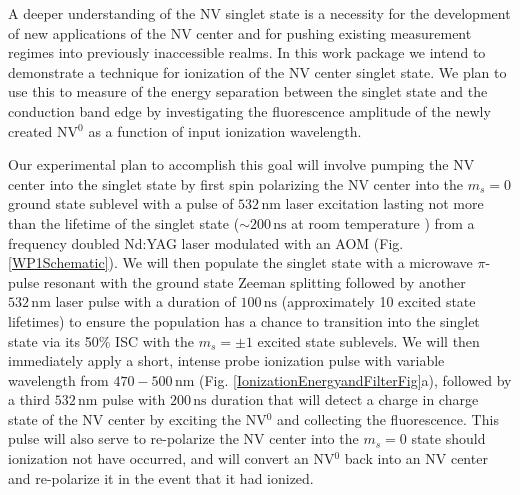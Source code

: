 \documentclass[11pt]{article}
\newcommand{\unit}[1]{\ensuremath{\, \mathrm{#1}}}
\begin{document}
A deeper understanding of the NV singlet state is a necessity for the development of new applications of the NV
center and for pushing existing measurement regimes into previously inaccessible realms.  In this work package we
intend to demonstrate a technique for ionization of the NV center singlet state.  We plan to use this to measure of the energy separation between the singlet state and the conduction band edge by investigating the fluorescence amplitude of the newly created NV$^0$ as a function of input ionization wavelength.

Our experimental plan to accomplish this goal will involve pumping the NV center into the singlet state by first spin
polarizing the NV center into the $m_s = 0$ ground state sublevel with a pulse of $532\unit{nm}$ laser
excitation
lasting not more than the lifetime of the singlet state ($\sim200\unit{ns}$ at room temperature
\cite{Dreau2011}) from a frequency
doubled Nd:YAG laser modulated with an AOM (Fig. \ref{WP1Schematic}).  We will then populate the singlet
state with a microwave
$\pi$-pulse resonant with the ground state Zeeman splitting followed by another $532\unit{nm}$ laser
pulse with a duration of
$100\unit{ns}$ (approximately 10 excited state lifetimes) to ensure the population has a chance to
transition into the
singlet state via its 50\% ISC with the $m_s = \pm1$ excited state sublevels.  We will then immediately apply a
short, intense
probe ionization pulse with variable wavelength from $470-500\unit{nm}$ (Fig. \ref{IonizationEnergyandFilterFig}a), followed by a third $532\unit{nm}$ pulse with
$200\unit{ns}$ duration that
will detect a charge in charge state of the NV center by 
exciting the NV$^0$ and collecting the fluorescence.  This pulse will also serve to re-polarize the NV center into the $m_s = 0$ state should
ionization
not have occurred, and will convert an NV$^0$ back into an NV center and re-polarize it in the event
that it had ionized.
\end{document}
